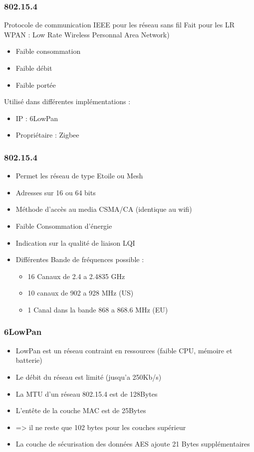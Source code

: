 \documentclass{smilebeamer}
\begin{document}
\begin{frame}
\frametitle {802.15.4}

Protocole de communication IEEE pour les réseau sans fil
Fait pour les LR WPAN : Low Rate Wireless Personnal Area Network)
\begin{itemize}
\item Faible consommation
\item Faible débit
\item Faible portée
\end{itemize}
Utilisé dans différentes implémentations :
\begin{itemize}
\item IP : 6LowPan
\item Propriétaire : Zigbee
\end{itemize}
\end{frame}

\begin{frame}
\frametitle {802.15.4}
\begin{itemize}
\item Permet les réseau de type Etoile ou Mesh
\item Adresses sur 16 ou 64 bits
\item Méthode d'accès au media CSMA/CA (identique au wifi)
\item Faible Consommation d'énergie
\item Indication sur la qualité de liaison LQI
\item Différentes Bande de fréquences possible :
\begin{itemize}
  \item  16 Canaux de 2.4 a 2.4835 GHz
  \item  10 canaux de 902 a 928 MHz (US)
  \item 1 Canal dans la bande 868 a 868.6 MHz (EU)
\end{itemize}
  \end{itemize}
\end{frame}

\begin{frame}

\frametitle{6LowPan}
\begin{itemize}
\item LowPan est un réseau contraint en ressources (faible CPU, mémoire et batterie)
\item Le débit du réseau est limité (jusqu'a 250Kb/s)
\item La MTU d'un réseau 802.15.4 est de 128Bytes
\item L'entête de la couche MAC est de 25Bytes
\item => il ne reste que 102 bytes pour les couches supérieur
\item La couche de sécurisation des données AES ajoute 21 Bytes supplémentaires
  \end{itemize}
\end{frame}
\end{document}
